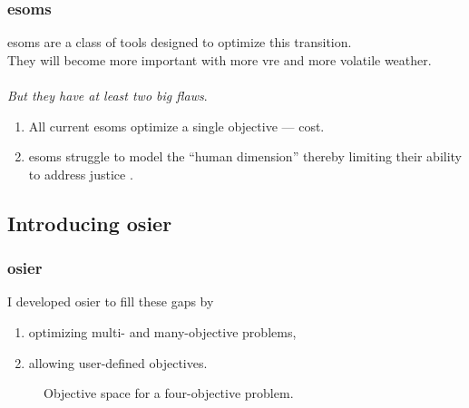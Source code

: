 \begin{frame}
    \frametitle{\glspl{esom}}
    \Glspl{esom} are a class of tools designed to 
    optimize this transition.
    \\

    They will become more important with more \gls{vre}
    and more volatile weather.
    \\\\
    \textit{But they have at least two big flaws}.
    \begin{enumerate}[<+->]
        \item All current \glspl{esom} optimize a single objective --- cost.
        \item \glspl{esom} struggle to model the ``human dimension'' thereby
        limiting their ability to address justice \cite{pfenninger_energy_2014}.
    \end{enumerate}
\end{frame}

\subsection{Introducing \gls{osier}}
\begin{frame}
    \frametitle{\gls{osier}}
    I developed \gls{osier} to fill these gaps by \cite{dotson_osier_2024}
    \begin{enumerate}
        \item optimizing multi- and many-objective problems,
        \item allowing user-defined objectives.
    \end{enumerate}
    
    \begin{figure}
        \centering
        \resizebox{0.95\columnwidth}{!}{}
        \caption{Objective space for a four-objective problem.}
        \label{fig:4-obj-space}
    \end{figure}
\end{frame}

